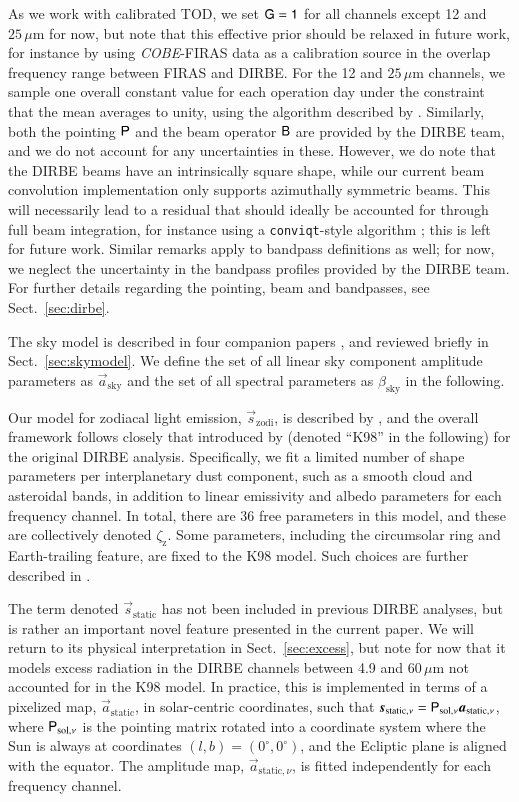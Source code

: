 \documentclass{aa}
\def\COBE{\textit{COBE}}
\newcommand{\B}[0]{\tens{B}}
\newcommand{\G}[0]{\tens{G}}
\newcommand{\s}[0]{\vec{s}}
\renewcommand{\a}[0]{\vec{a}}
\renewcommand{\P}[0]{\tens{P}}
\begin{document}
As we work with calibrated TOD, we set $\G=\tens{1}$ for all channels except 12 and $25\,\mu$m for now, but
note that this effective prior should be relaxed in future work, for
instance by using \COBE-FIRAS data as a calibration source in the
overlap frequency range between FIRAS and DIRBE. For the 12 and $25\,\mu$m channels, we sample one overall constant value for each operation day under the constraint that the mean averages to unity, using the algorithm described by \citet{bp07}. Similarly, both the
pointing $\P$ and the beam operator $\B$ are provided by the DIRBE
team, and we do not account for any uncertainties in these. However,
we do note that the DIRBE beams have an intrinsically square shape,
while our current beam convolution implementation only supports
azimuthally symmetric beams. This will necessarily lead to a residual
that should ideally be accounted for through full beam integration,
for instance using a \texttt{conviqt}-style algorithm
\citep{prezeau2010,keihanen2012}; this is left for future
work. Similar remarks apply to bandpass definitions as well; for now,
we neglect the uncertainty in the bandpass profiles provided by the
DIRBE team. For further details regarding the pointing, beam and
bandpasses, see Sect.~\ref{sec:dirbe}.

The sky model is described in four companion papers \citep{CG02_04,CG02_05,CG02_06,CG02_07}, and
reviewed briefly in Sect.~\ref{sec:skymodel}. We define the set of all
linear sky component amplitude parameters as $\a_{\mathrm{sky}}$ and
the set of all spectral parameters as $\beta_{\mathrm{sky}}$ in the
following.

Our model for zodiacal light emission, $\s_{\mathrm{zodi}}$, is
described by \citet{CG02_02}, and the overall framework follows
closely that introduced by \citet{kelsall1998} (denoted ``K98'' in the
following) for the original DIRBE analysis. Specifically, we fit a
limited number of shape parameters per interplanetary dust component,
such as a smooth cloud and asteroidal bands, in addition to linear
emissivity and albedo parameters for each frequency channel. In total,
there are {36} free parameters in this model, and these are collectively
denoted $\zeta_{\mathrm{z}}$. {Some parameters, including the circumsolar ring and Earth-trailing feature, are fixed to the K98 model. Such choices are further described in \citet{CG02_02}.}

The term denoted $\s_{\mathrm{static}}$ has not been included in
previous DIRBE analyses, but is rather an important novel feature
presented in the current paper. We will return to its physical
interpretation in Sect.~\ref{sec:excess}, but note for now that it
models excess radiation in the DIRBE channels between 4.9 and
60$\,\mu$m not accounted for in the K98 model. In practice, this is
implemented in terms of a pixelized map, $\a_{\mathrm{static}}$, in
solar-centric coordinates, such that $\s_{\mathrm{static},\nu} =
\P_{\mathrm{sol},\nu}\a_{\mathrm{static},\nu}$, where
$\P_{\mathrm{sol},\nu}$ is the pointing matrix rotated into a
coordinate system where the Sun is always at coordinates
$(l,b)=(0^{\circ},0^{\circ})$, and the Ecliptic plane is aligned with
the equator. The amplitude map, $\a_{\mathrm{static},\nu}$, is fitted
independently for each frequency channel.
\end{document}
